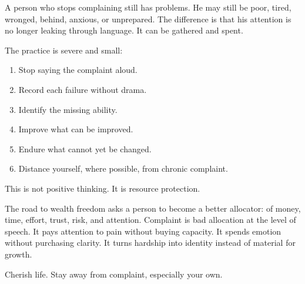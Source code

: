 A person who stops complaining still has problems. He may still be poor, tired, wronged, behind, anxious, or unprepared. The difference is that his attention is no longer leaking through language. It can be gathered and spent.

The practice is severe and small:

\begin{enumerate}
\item Stop saying the complaint aloud.
\item Record each failure without drama.
\item Identify the missing ability.
\item Improve what can be improved.
\item Endure what cannot yet be changed.
\item Distance yourself, where possible, from chronic complaint.
\end{enumerate}

This is not positive thinking. It is resource protection.

The road to wealth freedom asks a person to become a better allocator: of money, time, effort, trust, risk, and attention. Complaint is bad allocation at the level of speech. It pays attention to pain without buying capacity. It spends emotion without purchasing clarity. It turns hardship into identity instead of material for growth.

Cherish life. Stay away from complaint, especially your own.
